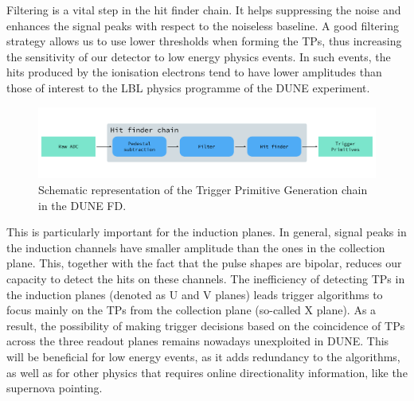 Filtering is a vital step in the hit finder chain. It helps suppressing the noise and enhances the signal peaks with respect to the noiseless baseline. A good filtering strategy allows us to use lower thresholds when forming the TPs, thus increasing the sensitivity of our detector to low energy physics events. In such events, the hits produced by the ionisation electrons tend to have lower amplitudes than those of interest to the LBL physics programme of the DUNE experiment.

\begin{figure}[t]
	\centering
	\includegraphics[width=0.99\linewidth]{Images/Matched_Filter/trigger_primitive_chain.pdf}
	\caption{Schematic representation of the Trigger Primitive Generation chain in the DUNE FD.}
	\label{fig:tpg_chain}
\end{figure}

This is particularly important for the induction planes. In general, signal peaks in the induction channels have smaller amplitude than the ones in the collection plane. This, together with the fact that the pulse shapes are bipolar, reduces our capacity to detect the hits on these channels. The inefficiency of detecting TPs in the induction planes (denoted as U and V planes) leads trigger algorithms to focus mainly on the TPs from the collection plane (so-called X plane). As a result, the possibility of making trigger decisions based on the coincidence of TPs across the three readout planes remains nowadays unexploited in DUNE. This will be beneficial for low energy events, as it adds redundancy to the algorithms, as well as for other physics that requires online directionality information, like the supernova pointing.

